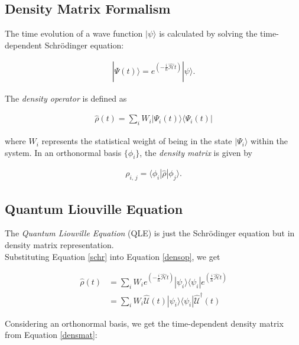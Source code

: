 \documentclass[svgnames]{article}
\begin{document}
\subsection{Density Matrix Formalism}

The time evolution of a wave function $|\psi\rangle$ is calculated by solving
the time-dependent Schr\"odinger equation: 

\begin{align}\label{schr}
    |\Psi(t)\rangle = e^{\left( -\frac{i}{\hbar}\hat{\mathcal{H}}t\right)}
    |\psi\rangle. 
\end{align}

The \textit{density operator} is defined as 

\begin{align}\label{densop}
\hat{\rho}(t) = \sum_{i}^{} W_i |\Psi_i(t)\rangle \langle \Psi_i(t)|
\end{align} 

where $W_i$ represents the statistical weight of being in the state
$|\Psi_i\rangle$ within the system. In an orthonormal basis $\{\phi_i\}$, the
\textit{density matrix} is given by 

\begin{align}\label{densmat}
    \rho_{i,\,j} = \langle\phi_i | \hat{\rho} | \phi_j\rangle. 
\end{align} 

\subsection{Quantum Liouville Equation}

The \textit{Quantum Liouville Equation} (QLE) is just the Schr\"odinger equation but
in density matrix representation. \\ 

Substituting Equation \ref{schr} into Equation \ref{densop}, we get 

\begin{align} \label{}
    \hat{\rho}(t) &= \sum_{i}^{} W_i e^{\left( -\frac{i}{\hbar}\hat{\mathcal{H}}t
\right)} |\psi_i\rangle \langle \psi_i|
e^{\left(\frac{i}{\hbar}\hat{\mathcal{H}}t\right)}\\
                  &= \sum_{i}^{} W_i \hat{\mathcal{U} }(t) |\psi_i\rangle
                  \langle \psi_i | \hat{\mathcal{U}}^\dagger (t)
\end{align}

Considering an orthonormal basis, we get the time-dependent density matrix from
Equation \ref{densmat}: 
\end{document}
